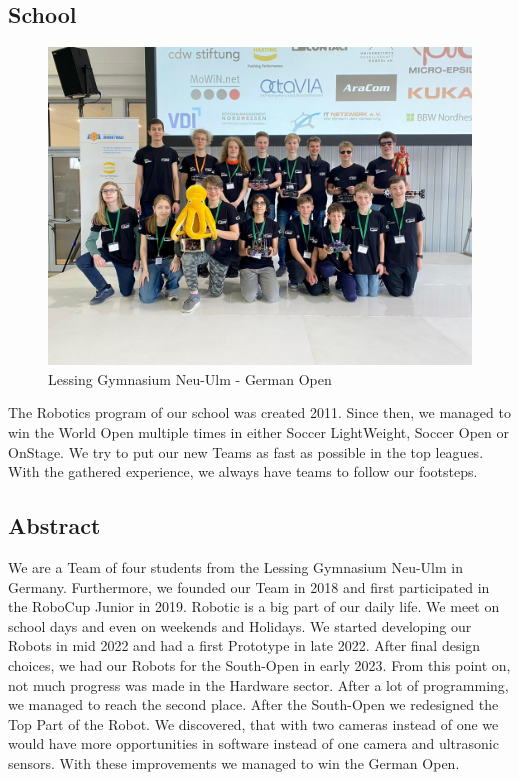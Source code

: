 \documentclass{scrartcl}
\begin{document}
\subsection{School}
\begin{figure}[ht]
    \centering
    \includegraphics[width=\textwidth]{img/LGNU.jpg}
    \caption{Lessing Gymnasium Neu-Ulm - German Open}
    \label{fig:LGNU}
\end{figure}

The Robotics program of our school was created 2011. Since then, we managed to win the World Open
multiple times in either Soccer LightWeight, Soccer Open or OnStage.
We try to put our new Teams as fast as possible in the top leagues. With the gathered experience, we always
have teams to follow our footsteps.
\newline


\subsection{Abstract}
We are a Team of four students from the Lessing Gymnasium Neu-Ulm in Germany. Furthermore, we founded our Team
in 2018 and first participated in the RoboCup Junior in 2019. Robotic is a big part of our daily life.
We meet on school days and even on weekends and Holidays.
\newline
\newline
We started developing our Robots in mid 2022 and had a first Prototype in late 2022. After final design
choices, we had our Robots for the South-Open in early 2023. From this point on, not much progress was
made in the Hardware sector.
After a lot of programming, we managed to reach the second place.
\newline
After the South-Open we redesigned the Top Part of the Robot. We discovered, that with two cameras
instead of one we would have more opportunities in software instead of one camera and ultrasonic sensors.
With these improvements we managed to win the German Open.
\end{document}
